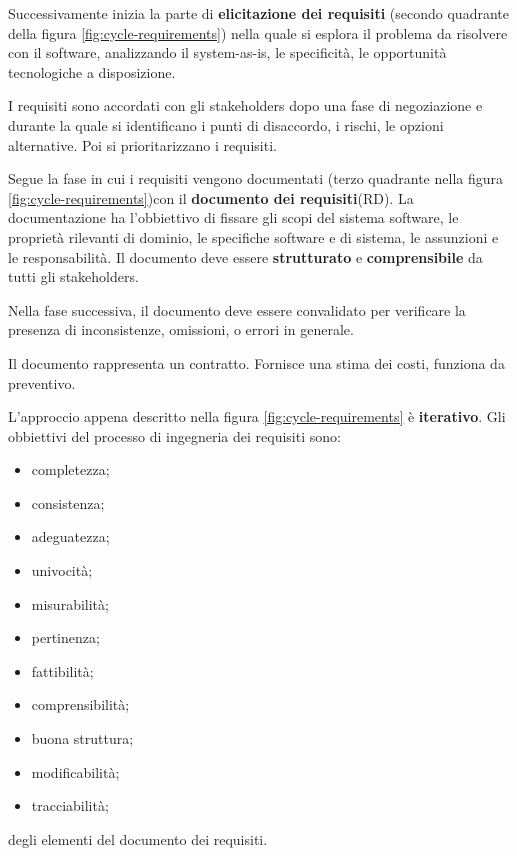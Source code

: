 \documentclass[italian]{article}
\begin{document}
		 Successivamente inizia la parte di \textbf{elicitazione dei requisiti} (secondo quadrante della figura \ref{fig:cycle-requirements}) nella quale si esplora il problema da risolvere con il software, analizzando il system-as-is, le specificità, le opportunità tecnologiche a disposizione.

		 I requisiti sono accordati con gli stakeholders dopo una fase di negoziazione e durante la quale si identificano i punti di disaccordo, i rischi, le opzioni alternative. Poi si prioritarizzano i requisiti.

		 Segue la fase in cui i requisiti vengono documentati (terzo quadrante nella figura \ref{fig:cycle-requirements})con il \textbf{documento dei requisiti}(RD). La documentazione ha l'obbiettivo di fissare gli scopi del sistema software, le proprietà rilevanti di dominio, le specifiche software e di sistema, le assunzioni e le responsabilità. Il documento deve essere \textbf{strutturato} e \textbf{comprensibile} da tutti gli stakeholders.

		 Nella fase successiva, il documento deve essere convalidato per verificare la presenza di inconsistenze, omissioni, o errori in generale.

		 Il documento rappresenta un contratto. Fornisce una stima dei costi, funziona da preventivo.

		 L'approccio appena descritto nella figura \ref{fig:cycle-requirements} è \textbf{iterativo}.
		Gli obbiettivi del processo di ingegneria dei requisiti sono:
		\begin{itemize}

			\item completezza;
			\item consistenza;
			\item adeguatezza;
			\item univocità;
			\item misurabilità;
			\item pertinenza;
			\item fattibilità;
			\item comprensibilità;
			\item buona struttura;
			\item modificabilità;
			\item tracciabilità;
		\end{itemize}
		degli elementi del documento dei requisiti.
\end{document}
